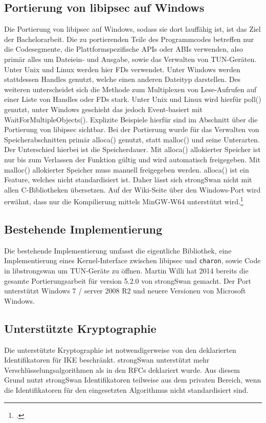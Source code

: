 \subsection{Portierung von libipsec auf Windows}
Die Portierung von libipsec auf Windows, sodass sie dort lauffähig ist, ist das Ziel
der Bachelorarbeit. Die zu portierenden Teile des Programmcodes betreffen nur
die Codesegmente, die Plattformspezifische \acp{API} oder \acp{ABI} verwenden,
also primär alles um Dateiein- und Ausgabe, sowie das Verwalten von TUN-Geräten.
Unter Unix und Linux werden hier \acp{FD} verwendet. Unter Windows werden stattdessen
Handles genutzt, welche einen anderen Dateityp darstellen. Des weiteren unterscheidet
sich die Methode zum Multiplexen von Lese-Aufrufen auf einer Liste von Handles oder \acp{FD} stark.
Unter Unix und Linux wird hierfür poll() genutzt, unter Windows geschieht das jedoch
Event-basiert mit WaitForMultipleObjects().
Explizite Beispiele hierfür sind im Abschnitt über die Portierung von libipsec sichtbar.
Bei der Portierung wurde für das Verwalten von Speicherabschnitten 
primär alloca() genutzt, statt malloc() und seine Unterarten. Der Unterschied hierbei ist die
Speicherdauer. Mit alloca() allokierter Speicher ist nur bis zum Verlassen der Funktion gültig
und wird automatisch freigegeben. Mit malloc() allokierter Speicher muss manuell freigegeben werden.
alloca() ist ein Feature, welches nicht standardisiert ist.
Daher lässt sich strongSwan nicht mit allen C-Bibliotheken übersetzen.
Auf der Wiki-Seite über den Windows-Port wird erwähnt, dass nur die Kompilierung
mittels MinGW-W64 unterstützt wird.\footcite[][]{_windows_2015}


\subsection{Bestehende Implementierung}
Die bestehende Implementierung umfasst die eigentliche Bibliothek, eine Implementierung
eines Kernel-Interface zwischen libipsec und \texttt{charon}, sowie Code in libstrongswan
um TUN-Geräte zu öffnen. Martin Willi hat 2014 bereits die gesamte Portierungsarbeit
für version 5.2.0 von strongSwan gemacht. Der Port unterstützt Windows 7 / server 2008 R2
und neuere Versionen von Microsoft Windows.

\subsection{Unterstützte Kryptographie}
Die unterstützte Kryptographie ist notwendigerweise von den deklarierten Identifikatoren
für IKE beschränkt. strongSwan unterstützt mehr Verschlüsselungsalgorithmen als
in den \acp{RFC} deklariert wurde. Aus diesem Grund nutzt strongSwan Identifikatoren
teilweise aus dem privaten Bereich, wenn die Identifikatoren für den eingesetzten Algorithmus
nicht standardisiert sind.

